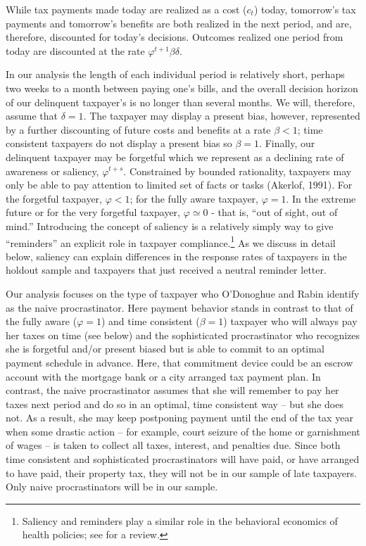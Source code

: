 While tax payments made today are realized as a cost  ($c_{t}$) today,
tomorrow's tax payments and tomorrow's benefits are both realized in
the next period, and are, therefore, discounted for today's decisions.
Outcomes realized one period from today are discounted at the rate
$\varphi^{t+1} \beta \delta$.

In our analysis the length of each individual period is relatively
short, perhaps two weeks to a month between paying one's bills, and
the overall decision horizon of our delinquent taxpayer's is no longer
than several months.  We will, therefore, assume that $\delta=1$.  The
taxpayer may display a present bias, however, represented by a further
discounting of future costs and benefits at a rate $\beta <1$; time
consistent taxpayers do not display a present bias so $\beta=1$.
Finally, our delinquent taxpayer may be forgetful which we represent
as a declining rate of awareness or saliency, $\varphi^{t+s}$.
Constrained by bounded rationality, taxpayers may only be able to pay
attention to limited set of facts or tasks (Akerlof, 1991).  For the
forgetful taxpayer, $\varphi < 1$; for the fully aware taxpayer,
$\varphi = 1$. In the extreme future or for the very forgetful
taxpayer, $\varphi \simeq 0$ - that is, ``out of sight, out of mind.''
Introducing the concept of saliency is a relatively simply way to give
``reminders'' an explicit role in taxpayer compliance.\footnote{
  Saliency and reminders play a similar role in the behavioral
  economics of health policies; see \cite{Kessler-Zhang-14} for a
  review.} As we discuss in detail below, saliency can explain
differences in the response rates of taxpayers in the holdout sample
and taxpayers that just received a neutral reminder letter.

Our analysis focuses on the type of taxpayer who O'Donoghue and Rabin
identify as the naive procrastinator.  Here payment behavior stands in
contrast to that of the fully aware ($\varphi = 1$) and time
consistent ($\beta = 1$) taxpayer who will always pay her taxes on
time (see below) and the sophisticated procrastinator who recognizes
she is forgetful and/or present biased but is able to commit to an
optimal payment schedule in advance.  Here, that commitment device
could be an escrow account with the mortgage bank or a city arranged
tax payment plan.  In contrast, the naive procrastinator assumes that
she will remember to pay her taxes next period and do so in an
optimal, time consistent way -- but she does not.  As a result, she
may keep postponing payment until the end of the tax year when some
drastic action -- for example, court seizure of the home or
garnishment of wages -- is taken to collect all taxes, interest, and
penalties due.  Since both time consistent and sophisticated
procrastinators will have paid, or have arranged to have paid, their
property tax, they will not be in our sample of late taxpayers.  Only
naive procrastinators will be in our sample.

